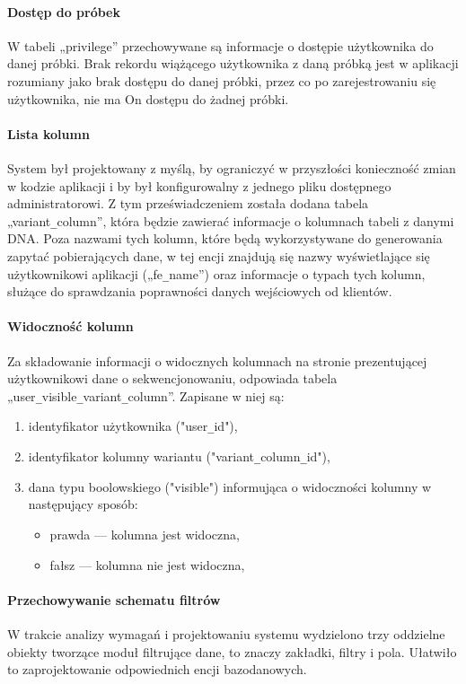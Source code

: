 \documentclass[a4paper,12pt,twoside]{article}
\begin{document}
\paragraph{Dostęp do próbek} W tabeli „privilege” przechowywane są informacje o
dostępie użytkownika do danej próbki. Brak rekordu wiążącego użytkownika z
daną próbką jest w aplikacji rozumiany jako brak dostępu do danej próbki,
przez co po zarejestrowaniu się użytkownika, nie ma On dostępu do żadnej próbki.

\paragraph{Lista kolumn} System był projektowany z myślą, by ograniczyć w przyszłości konieczność zmian
w kodzie aplikacji i by był konfigurowalny z jednego pliku dostępnego administratorowi.
Z tym przeświadczeniem została dodana tabela „variant\verb!_!column”, która będzie zawierać
informacje o kolumnach tabeli z danymi DNA. Poza nazwami tych kolumn, które będą
wykorzystywane do generowania zapytać pobierających dane, w tej encji znajdują
się nazwy wyświetlające się użytkownikowi aplikacji („fe\verb!_!name”) oraz informacje o typach
tych kolumn, służące do sprawdzania poprawności danych wejściowych od klientów.

\paragraph{Widoczność kolumn} Za składowanie informacji o widocznych kolumnach na
stronie prezentującej użytkownikowi dane o sekwencjonowaniu, odpowiada tabela \newline
„user\verb!_!visible\verb!_!variant\verb!_!column”. Zapisane w niej są:
\begin{enumerate}[1)]
\item identyfikator użytkownika ("user\verb!_!id"),
\item identyfikator kolumny wariantu ("variant\verb!_!column\verb!_!id"),
\item dana typu boolowskiego ("visible") informująca o widoczności kolumny w następujący sposób:
\begin{itemize}
\item prawda — kolumna jest widoczna,
\item fałsz — kolumna nie jest widoczna,
\end{itemize}
\end{enumerate}

\newpage
\paragraph{Przechowywanie schematu filtrów} W trakcie analizy wymagań i projektowaniu systemu wydzielono trzy oddzielne obiekty tworzące moduł filtrujące dane, to znaczy zakładki, filtry i pola.
Ułatwiło to zaprojektowanie odpowiednich encji bazodanowych.
\end{document}
